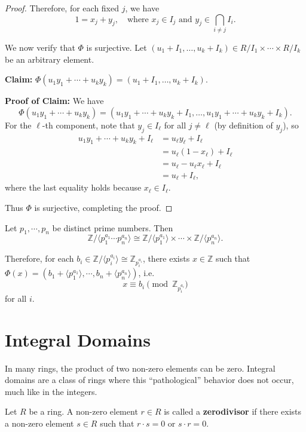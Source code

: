 \begin{proof}
Therefore, for each fixed $j$, we have 
$$1 = x_j + y_j, \quad \text{where } x_j \in I_j \text{ and } y_j \in \bigcap_{i \neq j} I_i.$$

We now verify that $\Phi$ is surjective. Let $(u_1 + I_1, \ldots, u_k + I_k) \in R/I_1 \times \cdots \times R/I_k$ be an arbitrary element. 

\textbf{Claim:} $\Phi(u_1 y_1 + \cdots + u_k y_k) = (u_1 + I_1, \ldots, u_k + I_k)$.

\textbf{Proof of Claim:} We have 
$$\Phi(u_1 y_1 + \cdots + u_k y_k) = (u_1 y_1 + \cdots + u_k y_k + I_1, \ldots, u_1 y_1 + \cdots + u_k y_k + I_k).$$
For the $\ell$-th component, note that $y_j \in I_\ell$ for all $j \neq \ell$ (by definition of $y_j$), so 
\begin{align*}
u_1 y_1 + \cdots + u_k y_k + I_\ell 
&= u_\ell y_\ell + I_\ell \\
&= u_\ell(1 - x_\ell) + I_\ell \\
&= u_\ell - u_\ell x_\ell + I_\ell \\
&= u_\ell + I_\ell,
\end{align*}
where the last equality holds because $x_\ell \in I_\ell$.

Thus $\Phi$ is surjective, completing the proof.
\end{proof}

\begin{corollary}
Let $p_1,\cdots,p_n$ be distinct prime numbers. Then $$\mathbb{Z}/\langle p_1^{a_1}\cdots p_n^{a_n}\rangle\cong\mathbb{Z}/\langle p_1^{a_1}\rangle\times\cdots\times\mathbb{Z}/\langle p_n^{a_n}\rangle.$$
\end{corollary}

Therefore, for each $b_i\in \mathbb{Z}/\langle p_i^{a_i}\rangle\cong \mathbb{Z}_{p_i^{a_i}}$, there exists $x\in \mathbb{Z}$ such that 
$\Phi(x)=(b_1+\langle p_1^{a_1}\rangle,\cdots,b_n+\langle p_n^{a_n}\rangle)$, i.e. 
$$x\equiv b_i \pmod{\mathbb{Z}_{p_i^{a_i}}}$$
for all $i$.



\section{Integral Domains} \label{sec-ID}

In many rings, the product of two non-zero elements can be zero. Integral domains are a class of rings where this ``pathological'' behavior does not occur, much like in the integers.

\begin{definition}[Zerodivisor]
Let $R$ be a ring. A non-zero element $r \in R$ is called a \textbf{zerodivisor} if there exists a non-zero element $s \in R$ such that $r \cdot s = 0$ or $s \cdot r = 0$.
\end{definition}

